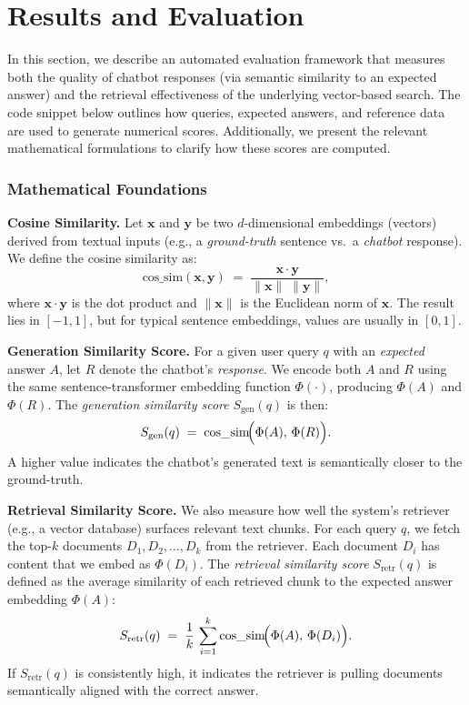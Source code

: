 \chapter{Results and Evaluation}
\label{sec:evaluation}

In this section, we describe an automated evaluation framework that measures both the quality of chatbot responses (via semantic similarity to an expected answer) and the retrieval effectiveness of the underlying vector-based search. The code snippet below outlines how queries, expected answers, and reference data are used to generate numerical scores. Additionally, we present the relevant mathematical formulations to clarify how these scores are computed.

\subsection{Mathematical Foundations}
\label{subsec:math-foundations}

\noindent\textbf{Cosine Similarity.}
Let $\mathbf{x}$ and $\mathbf{y}$ be two $d$-dimensional embeddings (vectors) derived from textual inputs (e.g., a \emph{ground-truth} sentence vs.\ a \emph{chatbot} response). We define the cosine similarity as:
\begin{equation}
  \text{cos\_sim}(\mathbf{x}, \mathbf{y}) \;=\; \frac{\mathbf{x} \cdot \mathbf{y}}{\|\mathbf{x}\|\;\|\mathbf{y}\|},
  \label{eq:cosine-sim}
\end{equation}
where $\mathbf{x} \cdot \mathbf{y}$ is the dot product and $\|\mathbf{x}\|$ is the Euclidean norm of $\mathbf{x}$. The result lies in $[-1, 1]$, but for typical sentence embeddings, values are usually in $[0,1]$.

\noindent\textbf{Generation Similarity Score.}
For a given user query $q$ with an \emph{expected} answer $A$, let $R$ denote the chatbot’s \emph{response}. We encode both $A$ and $R$ using the same sentence-transformer embedding function $\Phi(\cdot)$, producing $\Phi(A)$ and $\Phi(R)$. The \emph{generation similarity score} $S_\text{gen}(q)$ is then:
\begin{equation}
  S_\text{gen}(q) \;=\; \text{cos\_sim}\!\Bigl(\Phi(A),\, \Phi(R)\Bigr).
  \label{eq:generation-sim}
\end{equation}
A higher value indicates the chatbot’s generated text is semantically closer to the ground-truth.

\noindent\textbf{Retrieval Similarity Score.}
We also measure how well the system’s retriever (e.g., a vector database) surfaces relevant text chunks. For each query $q$, we fetch the top-$k$ documents $D_1, D_2, \ldots, D_k$ from the retriever. Each document $D_i$ has content that we embed as $\Phi(D_i)$. The \emph{retrieval similarity score} $S_\text{retr}(q)$ is defined as the average similarity of each retrieved chunk to the expected answer embedding $\Phi(A)$:
\begin{equation}
  S_\text{retr}(q) \;=\; \frac{1}{k}\,\sum_{i=1}^{k} \text{cos\_sim}\!\Bigl(\Phi(A),\, \Phi(D_i)\Bigr).
  \label{eq:retrieval-sim}
\end{equation}
If $S_\text{retr}(q)$ is consistently high, it indicates the retriever is pulling documents semantically aligned with the correct answer.

